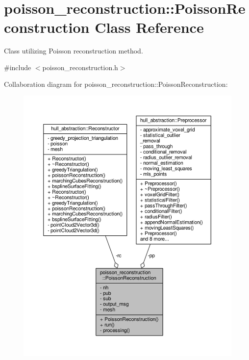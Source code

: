 \hypertarget{classpoisson__reconstruction_1_1_poisson_reconstruction}{}\section{poisson\+\_\+reconstruction\+:\+:Poisson\+Reconstruction Class Reference}
\label{classpoisson__reconstruction_1_1_poisson_reconstruction}


Class utilizing Poisson reconstruction method.  




{\ttfamily \#include $<$poisson\+\_\+reconstruction.\+h$>$}



Collaboration diagram for poisson\+\_\+reconstruction\+:\+:Poisson\+Reconstruction\+:
\nopagebreak
\begin{figure}[H]
\begin{center}
\leavevmode
\includegraphics[width=350pt]{classpoisson__reconstruction_1_1_poisson_reconstruction__coll__graph}
\end{center}
\end{figure}
